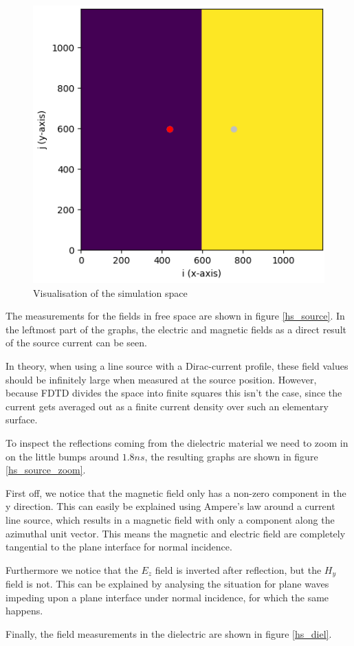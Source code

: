 \documentclass[11pt, a4paper]{article}
\begin{document}
\begin{figure}[H]
    \centering
    \includegraphics[width=0.6\linewidth]{halfspace/halfspace_viz.png}
    \caption{Visualisation of the simulation space}
    \label{hs_vis}
\end{figure}

The measurements for the fields in free space are shown in figure \ref{hs_source}. In the leftmost part of the graphs, the electric and magnetic fields as a direct result of the source current can be seen.

In theory, when using a line source with a Dirac-current profile, these field values should be infinitely large when measured at the source position. However, because FDTD divides the space into finite squares this isn't the case, since the current gets averaged out as a finite current density over such an elementary surface.

To inspect the reflections coming from the dielectric material we need to zoom in on the little bumps around $1.8 ns$, the resulting graphs are shown in figure \ref{hs_source_zoom}. 

First off, we notice that the magnetic field only has a non-zero component in the y direction. This can easily be explained using Ampere's law around a current line source, which results in a magnetic field with only a component along the azimuthal unit vector. This means the magnetic and electric field are completely tangential to the plane interface for normal incidence.

Furthermore we notice that the $E_z$ field is inverted after reflection, but the $H_y$ field is not. This can be explained by analysing the situation for plane waves impeding upon a plane interface under normal incidence, for which the same happens.

Finally, the field measurements in the dielectric are shown in figure \ref{hs_diel}. 
\end{document}
